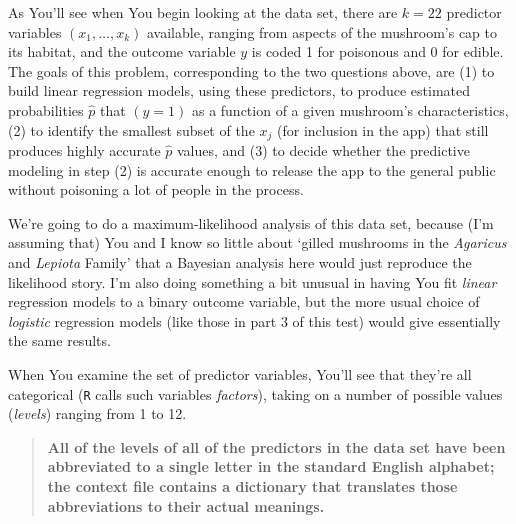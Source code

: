 \documentclass[12pt]{article}
\begin{document}
As You'll see when You begin looking at the data set, there are $k = 22$ predictor variables $( x_1, \dots, x_k )$ available, ranging from aspects of the mushroom's cap to its habitat, and the outcome variable $y$ is coded 1 for poisonous and 0 for edible. The goals of this problem, corresponding to the two questions above, are (1) to build linear regression models, using these predictors, to produce estimated probabilities $\hat{ p }$ that $( y = 1 )$ as a function of a given mushroom's characteristics, (2) to identify the smallest subset of the $x_j$ (for inclusion in the app) that still produces highly accurate $\hat{ p }$ values, and (3) to decide whether the predictive modeling in step (2) is accurate enough to release the app to the general public without poisoning a lot of people in the process.

We're going to do a maximum-likelihood analysis of this data set, because (I'm assuming that) You and I know so little about `gilled mushrooms in the \textit{Agaricus} and \textit{Lepiota} Family' that a Bayesian analysis here would just reproduce the likelihood story. I'm also doing something a bit unusual in having You fit \textit{linear} regression models to a binary outcome variable, but the more usual choice of \textit{logistic} regression models (like those in part 3 of this test) would give essentially the same results.

When You examine the set of predictor variables, You'll see that they're all categorical (\texttt{R} calls such variables \textit{factors}), taking on a number of possible values (\textit{levels}) ranging from 1 to 12. 

\begin{quote}

\textbf{ \vspace*{0.025in} All of the levels of all of the predictors in the data set have been abbreviated to a single letter in the standard English alphabet; the context file contains a dictionary that translates those abbreviations to their actual meanings.} 

\end{quote}
\end{document}
